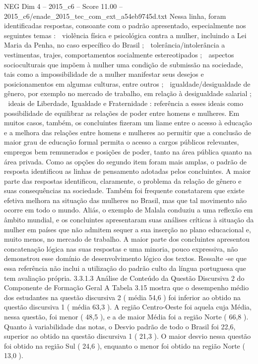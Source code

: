 \begin{textsample}{NEG Dim 4 – 2015\_c6 – Score 11.00 – 2015\_c6/enade\_2015\_tec\_com\_ext\_a54eb9745d.txt}
Nessa linha, foram identificadas respostas, consoante com o padrão apresentado, especialmente nos seguintes temas :  violência física e psicológica contra a mulher, incluindo a Lei Maria da Penha, no caso específico do Brasil ;  tolerância/intolerância a vestimentas, trajes, comportamentos socialmente estereotipados ;  aspectos socioculturais que impõem à mulher uma condição de submissão na sociedade, tais como a impossibilidade de a mulher manifestar seus desejos e posicionamentos em algumas culturas, entre outros ;  igualdade/desigualdade de gênero, por exemplo no mercado de trabalho, em relação à desigualdade salarial ;  ideais de Liberdade, Igualdade e Fraternidade : referência a esses ideais como possibilidade de equilibrar as relações de poder entre homens e mulheres.
Em muitos casos, também, os concluintes fizeram um liame entre o acesso à educação e a melhora das relações entre homens e mulheres ao permitir que a conclusão de maior grau de educação formal permita o acesso a cargos públicos relevantes, empregos bem remunerados e posições de poder, tanto na área pública quanto na área privada.
Como as opções do segundo item foram mais amplas, o padrão de resposta identificou as linhas de pensamento adotadas pelos concluintes.
A maior parte das respostas identificou, claramente, o problema da relação de gênero e suas consequências na sociedade.
Também foi frequente constatarem que existe efetiva melhora na situação das mulheres no Brasil, mas que tal movimento não ocorre em todo o mundo.
Aliás, o exemplo de Malala conduziu a uma reflexão em âmbito mundial, e os concluintes apresentaram suas análises críticas à situação da mulher em países que não admitem sequer a sua inserção no plano educacional e, muito menos, no mercado de trabalho.
A maior parte dos concluintes apresentou concatenação lógica nas suas respostas e uma minoria, pouco expressiva, não demonstrou esse domínio de desenvolvimento lógico dos textos.
Ressalte -se que essa referência não inclui a utilização do padrão culto da língua portuguesa que tem avaliação própria. 3.3.1.3 Análise de Conteúdo da Questão Discursiva 2 do Componente de Formação Geral A Tabela 3.15 mostra que o desempenho médio dos estudantes na questão discursiva 2 ( média 54,6 ) foi inferior ao obtido na questão discursiva 1 ( média 63,3 ).
A região Centro-Oeste foi aquela cuja Média, nessa questão, foi menor ( 48,5 ), e a de maior Média foi a região Norte ( 66,8 ).
Quanto à variabilidade das notas, o Desvio padrão de todo o Brasil foi 22,6, superior ao obtido na questão discursiva 1 ( 21,3 ).
O maior desvio nessa questão foi obtido na região Sul ( 24,6 ), enquanto o menor foi obtido na região Norte ( 13,0 ).

\end{textsample}
